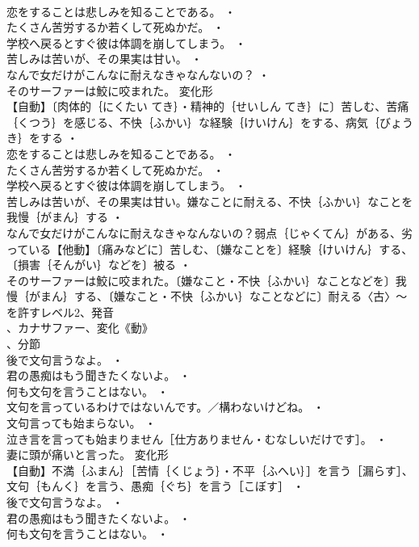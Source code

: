\documentclass[8pt]{extreport}
\begin{document}
\begin{CJK}{UTF8}{min}
\\	恋をすることは悲しみを知ることである。 ・
\\	たくさん苦労するか若くして死ぬかだ。 ・
\\	学校へ戻るとすぐ彼は体調を崩してしまう。 ・
\\	苦しみは苦いが、その果実は甘い。 ・
\\	なんで女だけがこんなに耐えなきゃなんないの？ ・
\\	そのサーファーは鮫に咬まれた。	変化形 
\\	【自動】〔肉体的｛にくたい てき｝・精神的｛せいしん てき｝に〕苦しむ、苦痛｛くつう｝を感じる、不快｛ふかい｝な経験｛けいけん｝をする、病気｛びょうき｝をする ・
\\	恋をすることは悲しみを知ることである。 ・
\\	たくさん苦労するか若くして死ぬかだ。 ・
\\	学校へ戻るとすぐ彼は体調を崩してしまう。 ・
\\	苦しみは苦いが、その果実は甘い。嫌なことに耐える、不快｛ふかい｝なことを我慢｛がまん｝する ・
\\	なんで女だけがこんなに耐えなきゃなんないの？弱点｛じゃくてん｝がある、劣っている【他動】〔痛みなどに〕苦しむ、〔嫌なことを〕経験｛けいけん｝する、〔損害｛そんがい｝などを〕被る ・
\\	そのサーファーは鮫に咬まれた。〔嫌なこと・不快｛ふかい｝なことなどを〕我慢｛がまん｝する、〔嫌なこと・不快｛ふかい｝なことなどに〕耐える〈古〉～を許すレベル2、発音
\\	、カナサファー、変化《動》
\\	、分節
\\	後で文句言うなよ。 ・
\\	君の愚痴はもう聞きたくないよ。 ・
\\	何も文句を言うことはない。 ・
\\	文句を言っているわけではないんです。／構わないけどね。 ・
\\	文句言っても始まらない。 ・
\\	泣き言を言っても始まりません［仕方ありません・むなしいだけです］。 ・
\\	妻に頭が痛いと言った。	変化形 
\\	【自動】不満｛ふまん｝［苦情｛くじょう｝・不平｛ふへい｝］を言う［漏らす］、文句｛もんく｝を言う、愚痴｛ぐち｝を言う［こぼす］ ・
\\	後で文句言うなよ。 ・
\\	君の愚痴はもう聞きたくないよ。 ・
\\	何も文句を言うことはない。 ・

\end{CJK}
\end{document}
